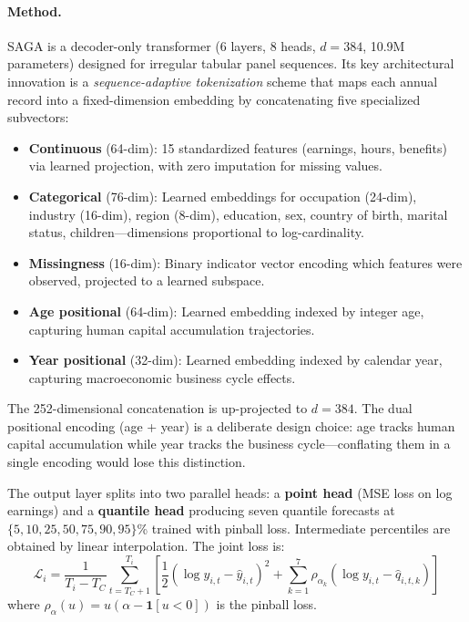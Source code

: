 \documentclass[11pt,a4paper]{article}
\begin{document}
\paragraph{Method.}
SAGA is a decoder-only transformer (6 layers, 8 heads, $d = 384$, 10.9M parameters) designed for irregular tabular panel sequences. Its key architectural innovation is a \emph{sequence-adaptive tokenization} scheme that maps each annual record into a fixed-dimension embedding by concatenating five specialized subvectors:
\begin{itemize}[nosep]
    \item \textbf{Continuous} (64-dim): 15 standardized features (earnings, hours, benefits) via learned projection, with zero imputation for missing values.
    \item \textbf{Categorical} (76-dim): Learned embeddings for occupation (24-dim), industry (16-dim), region (8-dim), education, sex, country of birth, marital status, children---dimensions proportional to log-cardinality.
    \item \textbf{Missingness} (16-dim): Binary indicator vector encoding which features were observed, projected to a learned subspace.
    \item \textbf{Age positional} (64-dim): Learned embedding indexed by integer age, capturing human capital accumulation trajectories.
    \item \textbf{Year positional} (32-dim): Learned embedding indexed by calendar year, capturing macroeconomic business cycle effects.
\end{itemize}
The 252-dimensional concatenation is up-projected to $d = 384$. The dual positional encoding (age + year) is a deliberate design choice: age tracks human capital accumulation while year tracks the business cycle---conflating them in a single encoding would lose this distinction.

The output layer splits into two parallel heads: a \textbf{point head} (MSE loss on log earnings) and a \textbf{quantile head} producing seven quantile forecasts at $\{5, 10, 25, 50, 75, 90, 95\}$\% trained with pinball loss. Intermediate percentiles are obtained by linear interpolation. The joint loss is:
\begin{equation}
    \mathcal{L}_i = \frac{1}{T_i - T_C} \sum_{t=T_C+1}^{T_i} \left[ \frac{1}{2}(\log y_{i,t} - \hat{y}_{i,t})^2 + \sum_{k=1}^{7} \rho_{\alpha_k}(\log y_{i,t} - \hat{q}_{i,t,k}) \right]
\end{equation}
where $\rho_\alpha(u) = u(\alpha - \mathbf{1}[u < 0])$ is the pinball loss.
\end{document}

